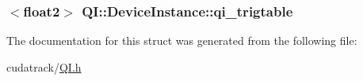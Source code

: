 \subsubsection[{\texorpdfstring{qi\+\_\+trigtable}{qi_trigtable}}]{$<$float2$>$ Q\+I\+::\+Device\+Instance\+::qi\+\_\+trigtable}\hypertarget{struct_q_i_1_1_device_instance_ab730111e2f8c985f989292bd08a37cb2}{}\label{struct_q_i_1_1_device_instance_ab730111e2f8c985f989292bd08a37cb2}


The documentation for this struct was generated from the following file\+:\begin{DoxyCompactItemize}
\item 
cudatrack/\hyperlink{_q_i_8h}{Q\+I.\+h}\end{DoxyCompactItemize}
